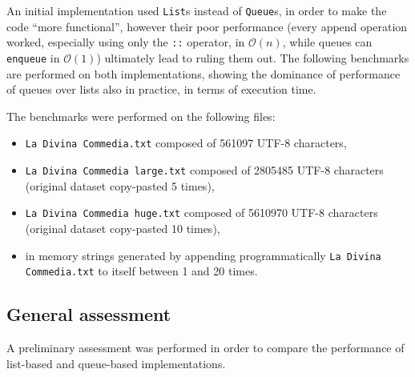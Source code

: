 An initial implementation used \texttt{List}s instead of \texttt{Queue}s, in order to make the code ``more functional'', however their poor performance (every append operation worked, especially using only the \texttt{::} operator, in $\mathcal{O}(n)$, while queues can \texttt{enqueue} in $\mathcal{O}(1)$) ultimately lead to ruling them out.
The following benchmarks are performed on both implementations, showing the dominance of performance of queues over lists also in practice, in terms of execution time.

The benchmarks were performed on the following files:
\begin{itemize}
	\item \texttt{La Divina Commedia.txt} composed of 561097 UTF-8 characters,
	\item \texttt{La Divina Commedia large.txt} composed of 2805485 UTF-8 characters (original dataset copy-pasted 5 times),
	\item \texttt{La Divina Commedia huge.txt} composed of 5610970 UTF-8 characters (original dataset copy-pasted 10 times),
	\item in memory strings generated by appending programmatically \texttt{La Divina Commedia.txt} to itself between 1 and 20 times.
\end{itemize}

\subsection{General assessment}

A preliminary assessment was performed in order to compare the performance of list-based and queue-based implementations.

